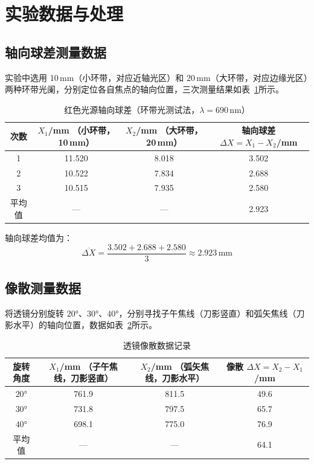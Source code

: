 \documentclass[12pt, a4paper]{article}
\begin{document}
\section{实验数据与处理}
\subsection{轴向球差测量数据}
实验中选用 10\,mm（小环带，对应近轴光区）和 20\,mm（大环带，对应边缘光区）两种环带光阑，分别定位各自焦点的轴向位置，三次测量结果如表~\ref{tab:spherical}所示。

\begin{table}[H]
  \centering
  \caption{红色光源轴向球差（环带光测试法，$\lambda = 690$\,nm）}
  \label{tab:spherical}
  \begin{tabular}{cccc}
    \toprule
    次数 & \makecell{$X_1$/mm\\（小环带，10\,mm）} & \makecell{$X_2$/mm\\（大环带，20\,mm）} & \makecell{轴向球差\\$\Delta X = X_1 - X_2$/mm} \\
    \midrule
    1 & 11.520 & 8.018 & 3.502 \\
    2 & 10.522 & 7.834 & 2.688 \\
    3 & 10.515 & 7.935 & 2.580 \\
    \midrule
    平均值 & — & — & 2.923 \\
    \bottomrule
  \end{tabular}
\end{table}

轴向球差均值为：
\begin{equation}
  \overline{\Delta X} = \frac{3.502 + 2.688 + 2.580}{3} \approx 2.923\,\text{mm}
  \label{eq:spherical_avg}
\end{equation}

\subsection{像散测量数据}
将透镜分别旋转 $20°$、$30°$、$40°$，分别寻找子午焦线（刀影竖直）和弧矢焦线（刀影水平）的轴向位置，数据如表~\ref{tab:astig}所示。

\begin{table}[H]
  \centering
  \caption{透镜像散数据记录}
  \label{tab:astig}
  \begin{tabular}{cccc}
    \toprule
    旋转角度 & \makecell{$X_1$/mm\\（子午焦线，刀影竖直）} & \makecell{$X_2$/mm\\（弧矢焦线，刀影水平）} & \makecell{像散\\$\Delta X = X_2 - X_1$/mm} \\
    \midrule
    $20°$ & 761.9 & 811.5 & 49.6 \\
    $30°$ & 731.8 & 797.5 & 65.7 \\
    $40°$ & 698.1 & 775.0 & 76.9 \\
    \midrule
    平均值 & — & — & 64.1 \\
    \bottomrule
  \end{tabular}
\end{table}
\end{document}
